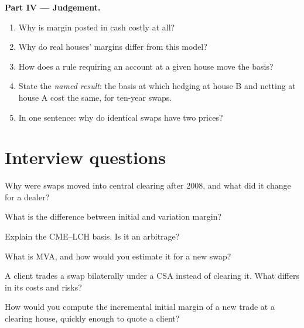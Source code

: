 \begin{problem}
\medskip\noindent\textbf{Part IV --- Judgement.}
\begin{enumerate}[resume]
\item Why is margin posted in cash costly at all?
\item Why do real houses' margins differ from this model?
\item How does a rule requiring an account at a given house move the basis?
\item State the \emph{named result}: the basis at which hedging at house B and
netting at house A cost the same, for ten-year swaps.
\item In one sentence: why do identical swaps have two prices?
\end{enumerate}
\end{problem}

\section{Interview questions}

\begin{interviewq}\label{iq:m2:swap-clearing-and-the-ccp-basis:1}
Why were swaps moved into central clearing after 2008, and what did it change
for a dealer?
\end{interviewq}

\begin{interviewq}\label{iq:m2:swap-clearing-and-the-ccp-basis:2}
What is the difference between initial and variation margin?
\end{interviewq}

\begin{interviewq}\label{iq:m2:swap-clearing-and-the-ccp-basis:3}
Explain the CME--LCH basis. Is it an arbitrage?
\end{interviewq}

\begin{interviewq}\label{iq:m2:swap-clearing-and-the-ccp-basis:4}
What is MVA, and how would you estimate it for a new swap?
\end{interviewq}

\begin{interviewq}\label{iq:m2:swap-clearing-and-the-ccp-basis:5}
A client trades a swap bilaterally under a CSA instead of clearing it. What
differs in its costs and risks?
\end{interviewq}

\begin{interviewq}\label{iq:m2:swap-clearing-and-the-ccp-basis:6}
How would you compute the incremental initial margin of a new trade at a
clearing house, quickly enough to quote a client?
\end{interviewq}
